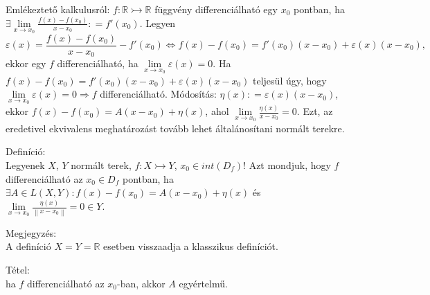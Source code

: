 \documentclass[12pt,a4paper]{scrartcl}
\newenvironment{definicio}{}{}
\newenvironment{tetel}{}{}
\newenvironment{megjegyzes}{}{}
\begin{document}
Emlékeztető kalkulusról:
\(\left. f:{\mathbb{R}}\rightarrowtail{\mathbb{R}} \right.\) függvény
differenciálható egy \(x_{0}\) pontban, ha
\(\exists\underset{x\rightarrow x_{0}}{\lim}\frac{f\left( x \right) - f\left( x_{0} \right)}{x - x_{0}}: = f'\left( x_{0} \right)\).
Legyen
\[\left. \varepsilon\left( x \right) = \frac{f\left( x \right) - f\left( x_{0} \right)}{x - x_{0}} - f'\left( x_{0} \right)\Leftrightarrow f\left( x \right) - f\left( x_{0} \right) = f'\left( x_{0} \right)\left( {x - x_{0}} \right) + \varepsilon\left( x \right){\left( {x - x_{0}} \right),} \right.\]
ekkor egy \(f\) differenciálható, ha
\(\underset{x\rightarrow x_{0}}{\lim}\varepsilon\left( x \right) = 0\).
Ha
\(f\left( x \right) - f\left( x_{0} \right) = f'\left( x_{0} \right)\left( {x - x_{0}} \right) + \varepsilon\left( x \right)\left( {x - x_{0}} \right)\)
teljesül úgy, hogy
\(\left. \underset{x\rightarrow x_{0}}{\lim}\varepsilon\left( x \right) = 0\Rightarrow f \right.\)
differenciálható. Módosítás:
\(\eta\left( x \right): = \varepsilon\left( x \right)\left( {x - x_{0}} \right)\),
ekkor
\(f\left( x \right) - f\left( x_{0} \right) = A\left( {x - x_{0}} \right) + \eta\left( x \right)\),
ahol
\(\underset{x\rightarrow x_{0}}{\lim}\frac{\eta\left( x \right)}{x - x_{0}} = 0\).
Ezt, az eredetivel ekvivalens meghatározást tovább lehet általánosítani
normált terekre.

\begin{definicio}

Definíció:\\
Legyenek \(X\), \(Y\) normált terek,
\(\left. f:X\rightarrowtail Y \right.\),
\(x_{0} \in {int}\left( D_{f} \right)\)! Azt mondjuk, hogy \(f\)
differenciálható az \(x_{0} \in D_{f}\) pontban, ha
\(\exists A \in L\left( {X,Y} \right):f\left( x \right) - f\left( x_{0} \right) = A\left( {x - x_{0}} \right) + \eta\left( x \right)\)
és
\(\underset{x\rightarrow x_{0}}{\lim}\frac{\eta\left( x \right)}{\left\| {x - x_{0}} \right\|} = 0 \in Y\).

\end{definicio}

\begin{megjegyzes}

Megjegyzés:\\
A definíció \(X = Y = {\mathbb{R}}\) esetben visszaadja a klasszikus
definíciót.

\end{megjegyzes}

\begin{tetel}

Tétel:\\
ha \(f\) differenciálható az \(x_{0}\)-ban, akkor \(A\) egyértelmű.

\end{tetel}
\end{document}
